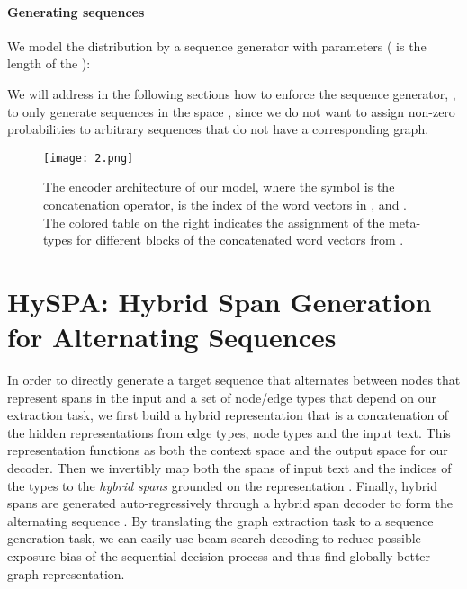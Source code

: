 \documentclass[11pt,a4paper]{article}
\begin{document}
\paragraph{Generating sequences}
We model the distribution  by a sequence generator  with parameters  ( is the length of the ):

We will address in the following sections how to enforce the sequence generator, , to only generate  sequences in the space  , since we do not want  to assign non-zero probabilities to  arbitrary sequences that do not have a corresponding graph. 












 






\begin{figure*}[htb]
\centering
\texttt{[image: 2.png]}
\caption{The encoder architecture of our model, where the  symbol is the concatenation operator,  is the index of the word vectors in , and . The colored table on the right indicates the assignment of the meta-types for different blocks of the concatenated word vectors from . }\label{f2}
\end{figure*}





\section{HySPA: Hybrid Span Generation for Alternating Sequences}










In order to directly generate a target  sequence that alternates between  nodes that represent spans in the input and a set of node/edge types that depend on our extraction task, we first build a hybrid representation  that is a concatenation of the hidden representations from edge types, node types and the input text. This representation functions as both the context space and the output space for our decoder. Then we invertibly map both the spans of input text and the indices of the types to the \emph{hybrid spans} grounded on the representation .
Finally, hybrid spans are generated auto-regressively through a hybrid span decoder to form the alternating sequence . By translating the graph extraction task to a sequence generation task, we can easily use beam-search decoding to reduce possible exposure bias \cite{beam} of the sequential decision process and thus find globally better graph representation.
\end{document}
